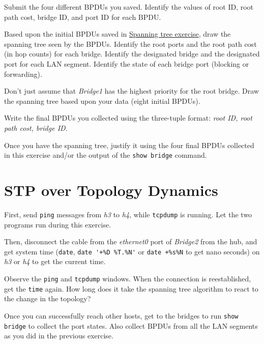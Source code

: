 \documentclass{../UTNetLab}
\begin{document}
    \begin{report}
    \item \item Submit the four different BPDUs you saved.
    Identify the values of root ID, root path cost, bridge ID, and port ID for each BPDU.

    \item Based upon the initial BPDUs saved in \href{sec:spanning-tree}{Spanning tree exercise}, draw the spanning tree seen by the BPDUs. Identify the root ports and the root path cost (in hop counts) for each bridge.
    Identify the designated bridge and the designated port for each LAN segment.
    Identify the state of each bridge port (blocking or forwarding).

    Don’t just assume that \textit{Bridge1} has the highest priority for the root bridge.
    Draw the spanning tree based upon your data (eight initial BPDUs).

    \item Write the final BPDUs you collected using the three-tuple format: \textit{{root ID, root path cost, bridge ID}}.

    \item Once you have the spanning tree, justify it using the four final BPDUs collected in this exercise and/or the output of the \lstinline[language={cisco}]{show bridge} command.
    \end{report}


\section{STP over Topology Dynamics}
    First, send \lstinline{ping} messages from \textit{h3} to \textit{h4}, while \lstinline{tcpdump} is running.
    Let the two programs run during this exercise.

    Then, disconnect the cable from the \textit{ethernet0} port of \textit{Bridge2} from the hub, and get system time (\lstinline{date}, \lstinline{date '+%D %T.%N'} or \lstinline{date +%s%N} to get nano seconds) on \textit{h3} or \textit{h4} to get the current time.

    Observe the \lstinline{ping} and \lstinline{tcpdump} windows. When the connection is reestablished, get the \lstinline{time} again. How long does it take the spanning tree algorithm to react to the change in the topology?

    Once you can successfully reach other hosts, get to the bridges to run \lstinline[language={cisco}]{show bridge} to collect the port states. Also collect BPDUs from all the LAN segments as you did in the previous exercise.
\end{document}
